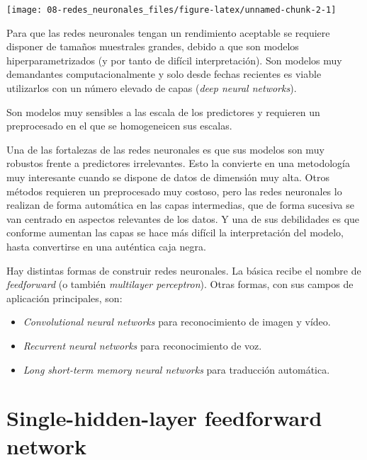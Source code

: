 \documentclass[
]{book}
\theoremstyle{break}
\theoremstyle{definition}
\theoremstyle{definition}
\theoremstyle{definition}
\theoremstyle{remark}
\begin{document}
\begin{center}\texttt{[image: 08-redes\_neuronales\_files/figure-latex/unnamed-chunk-2-1]} \end{center}

Para que las redes neuronales tengan un rendimiento aceptable se requiere disponer de tamaños muestrales grandes, debido a que son modelos hiperparametrizados (y por tanto de difícil interpretación). Son modelos muy demandantes computacionalmente y solo desde fechas recientes es viable utilizarlos con un número elevado de capas (\emph{deep neural networks}).

Son modelos muy sensibles a las escala de los predictores y requieren un preprocesado en el que se homogeneicen sus escalas.

Una de las fortalezas de las redes neuronales es que sus modelos son muy robustos frente a predictores irrelevantes. Esto la convierte en una metodología muy interesante cuando se dispone de datos de dimensión muy alta. Otros métodos requieren un preprocesado muy costoso, pero las redes neuronales lo realizan de forma automática en las capas intermedias, que de forma sucesiva se van centrado en aspectos relevantes de los datos. Y una de sus debilidades es que conforme aumentan las capas se hace más difícil la interpretación del modelo, hasta convertirse en una auténtica caja negra.

Hay distintas formas de construir redes neuronales. La básica recibe el nombre de \emph{feedforward} (o también \emph{multilayer perceptron}). Otras formas, con sus campos de aplicación principales, son:

\begin{itemize}
\item
  \emph{Convolutional neural networks} para reconocimiento de imagen y vídeo.
\item
  \emph{Recurrent neural networks} para reconocimiento de voz.
\item
  \emph{Long short-term memory neural networks} para traducción automática.
\end{itemize}

\hypertarget{single-hidden-layer-feedforward-network}{%
\section{Single-hidden-layer feedforward network}\label{single-hidden-layer-feedforward-network}}
\end{document}
